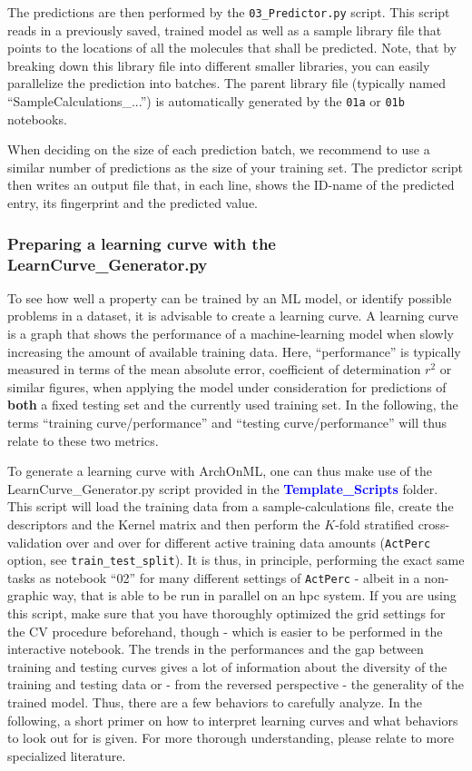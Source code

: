 \documentclass[12pt]{achemso}
\newcommand{\bl}[1]{\textcolor{blue}{\textbf{#1}}}
\begin{document}
\noindent The predictions are then performed by the \verb+03_Predictor.py+ script. This script reads in a previously saved, trained model as well as a sample library file that points to the locations of all the molecules that shall be predicted. Note, that by breaking down this library file into different smaller libraries, you can easily parallelize the prediction into batches. The parent library file (typically named ``SampleCalculations\_...'') is automatically generated by the \verb+01a+ or \verb+01b+ notebooks.

\noindent When deciding on the size of each prediction batch, we recommend to use a similar number of predictions as the size of your training set. The predictor script then writes an output file that, in each line, shows the ID-name of the predicted entry, its fingerprint and the predicted value.

\subsubsection{Preparing a learning curve with the LearnCurve\_Generator.py}

\noindent To see how well a property can be trained by an ML model, or identify possible problems in a dataset, it is advisable to create a learning curve. A learning curve is a graph that shows the performance of a machine-learning model when slowly increasing the amount of available training data. Here, ``performance'' is typically measured in terms of the mean absolute error, coefficient of determination $r^2$ or similar figures, when applying the model under consideration for predictions of \textbf{both} a fixed testing set and the currently used training set. In the following, the terms ``training curve/performance'' and ``testing curve/performance'' will thus relate to these two metrics.

\noindent To generate a learning curve with ArchOnML, one can thus make use of the LearnCurve\_Generator.py script provided in the \bl{Template\_Scripts} folder. This script will load the training data from a sample-calculations file, create the descriptors and the Kernel matrix and then perform the $K$-fold stratified cross-validation over and over for different active training data amounts (\verb+ActPerc+ option, see \verb+train_test_split+). It is thus, in principle, performing the exact same tasks as notebook ``02'' for many different settings of \verb+ActPerc+ - albeit in a non-graphic way, that is able to be run in parallel on an hpc system. If you are using this script, make sure that you have thoroughly optimized the grid settings for the CV procedure beforehand, though - which is easier to be performed in the interactive notebook. The trends in the performances and the gap between training and testing curves gives a lot of information about the diversity of the training and testing data or - from the reversed perspective - the generality of the trained model. Thus, there are a few behaviors to carefully analyze. In the following, a short primer on how to interpret learning curves and what behaviors to look out for is given. For more thorough understanding, please relate to more specialized literature.
\end{document}
